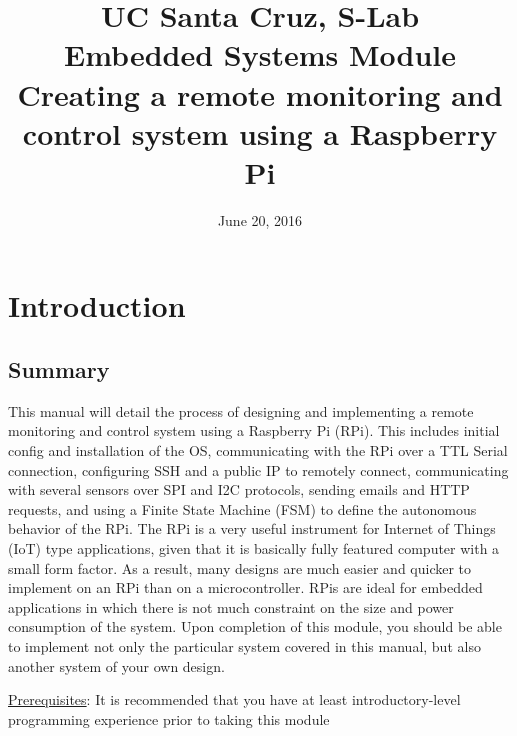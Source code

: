 \documentclass{article}
\title{
  UC Santa Cruz, S-Lab \\
  \colorbox{BurntOrange}{\textbf{Embedded Systems Module}} \\
  Creating a remote monitoring and control system using a Raspberry Pi \\
}
\date{June 20, 2016}
\begin{document}
\maketitle

\tableofcontents

\section{Introduction}
  \subsection{Summary}
  This manual will detail the process of designing and implementing a remote monitoring and control system using a Raspberry Pi (RPi). This includes initial config and installation of the OS, communicating with the RPi over a TTL Serial connection, configuring SSH and a public IP to remotely connect, communicating with several sensors over SPI and I2C protocols, sending emails and HTTP requests, and using a Finite State Machine (FSM) to define the autonomous behavior of the RPi.
  The RPi is a very useful instrument for Internet of Things (IoT) type applications, given that it is basically fully featured computer with a small form factor. As a result, many designs are much easier and quicker to implement on an RPi than on a microcontroller. RPis are ideal for embedded applications in which there is not much constraint on the size and power consumption of the system. Upon completion of this module, you should be able to implement not only the particular system covered in this manual, but also another system of your own design.

  \underline{Prerequisites}: It is recommended that you have at least introductory-level programming experience prior to taking this module
\end{document}
